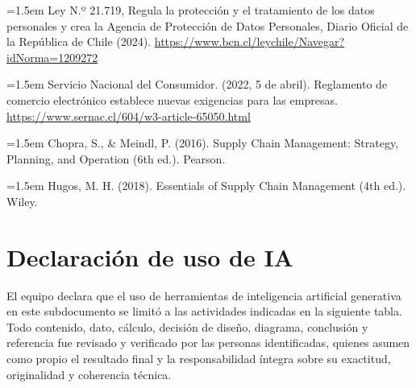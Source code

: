 \documentclass[11pt]{article}
\begin{document}
\noindent\hangindent=1.5em Ley N.º 21.719, Regula la protección y el tratamiento de los datos personales y crea la Agencia de Protección de Datos Personales, Diario Oficial de la República de Chile (2024). \url{https://www.bcn.cl/leychile/Navegar?idNorma=1209272}

\noindent\hangindent=1.5em Servicio Nacional del Consumidor. (2022, 5 de abril). Reglamento de comercio electrónico establece nuevas exigencias para las empresas. \url{https://www.sernac.cl/604/w3-article-65050.html}

\noindent\hangindent=1.5em Chopra, S., \& Meindl, P. (2016). Supply Chain Management: Strategy, Planning, and Operation (6th ed.). Pearson.

\noindent\hangindent=1.5em Hugos, M. H. (2018). Essentials of Supply Chain Management (4th ed.). Wiley.

\section*{Declaración de uso de IA}

El equipo declara que el uso de herramientas de inteligencia artificial generativa en este subdocumento se limitó a las actividades indicadas en la siguiente tabla. Todo contenido, dato, cálculo, decisión de diseño, diagrama, conclusión y referencia fue revisado y verificado por las personas identificadas, quienes asumen como propio el resultado final y la responsabilidad íntegra sobre su exactitud, originalidad y coherencia técnica.
\end{document}
